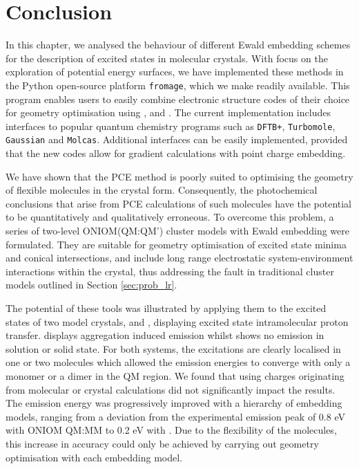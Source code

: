 \section{Conclusion}

In this chapter, we analysed the behaviour of different Ewald embedding schemes for the description of excited states in molecular crystals. With focus on the exploration of potential energy surfaces, we have implemented these methods in the Python open-source platform \texttt{fromage}, which we make readily available.  This program enables users to easily combine electronic structure codes of their choice for geometry optimisation using \EC{}, \EEC{} and \SCEEC{}. The current implementation includes interfaces to popular quantum chemistry programs such as \texttt{DFTB+}, \texttt{Turbomole}, \texttt{Gaussian} and \texttt{Molcas}. Additional interfaces can be easily implemented, provided that the new codes allow for gradient calculations with point charge embedding.

We have shown that the PCE method is poorly suited to optimising the geometry of flexible molecules in the crystal form. Consequently, the photochemical conclusions that arise from PCE calculations of such molecules have the potential to be quantitatively and qualitatively erroneous. To overcome this problem, a series of two-level ONIOM(QM:QM') cluster models with Ewald embedding were formulated. They are suitable for geometry optimisation of excited state minima and conical intersections, and include long range electrostatic system-environment interactions within the crystal, thus addressing the fault in traditional cluster models outlined in Section \ref{sec:prob_lr}.

The potential of these tools was illustrated by applying them to the excited states of two model crystals, \HC{} and \HCC{}, displaying excited state intramolecular proton transfer. \HC{} displays aggregation induced emission whilst \HCC{} shows no emission in solution or solid state. For both systems, the excitations are clearly localised in one or two molecules which allowed the emission energies to converge with only a monomer or a dimer in the QM region. We found that using charges originating from molecular or crystal calculations did not significantly impact the results. The emission energy was progressively improved with a hierarchy of embedding models, ranging from a deviation from the experimental emission peak of 0.8 eV with ONIOM QM:MM to 0.2 eV with \EEC{}. Due to the flexibility of the molecules, this increase in accuracy could only be achieved by carrying out geometry optimisation with each embedding model.  
 
